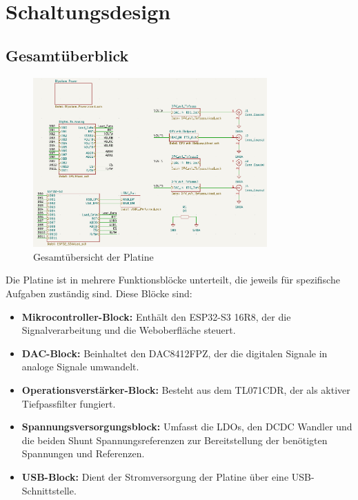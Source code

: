 \section{Schaltungsdesign}
\subsection{Gesamtüberblick}
\begin{figure}[H]
    \centering
    \includegraphics[width=0.8\textwidth]{bilder/Platine_gesamt.png}
    \caption{Gesamtübersicht der Platine}
    \label{fig:gesamtuebersicht}
\end{figure}
Die Platine ist in mehrere Funktionsblöcke unterteilt, die jeweils für spezifische Aufgaben zuständig sind. Diese Blöcke sind:
\begin{itemize}
    \item \textbf{Mikrocontroller-Block:} Enthält den ESP32-S3 16R8, der die Signalverarbeitung und die Weboberfläche steuert.
    \item \textbf{DAC-Block:} Beinhaltet den DAC8412FPZ, der die digitalen Signale in analoge Signale umwandelt.
    \item \textbf{Operationsverstärker-Block:} Besteht aus dem TL071CDR, der als aktiver Tiefpassfilter fungiert.
    \item \textbf{Spannungsversorgungsblock:} Umfasst die LDOs, den DCDC Wandler und die beiden Shunt Spannungsreferenzen zur Bereitstellung der benötigten Spannungen und Referenzen.
    \item \textbf{USB-Block:} Dient der Stromversorgung der Platine über eine USB-Schnittstelle.
\end{itemize}

